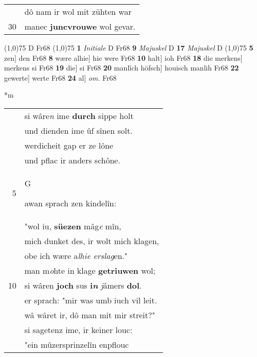\documentclass[8pt,a4paper,notitlepage]{article}
\begin{document}
\begin{table}[ht]
\begin{minipage}[t]{0.5\linewidth}
\begin{tabular}{rl}
 & dô nam ir wol mit zühten war\\ 
30 & manec \textbf{juncvrouwe} wol gevar.\\ 
\end{tabular}
\scriptsize
\line(1,0){75} \newline
D Fr68 \newline
\line(1,0){75} \newline
\textbf{1} \textit{Initiale} D Fr68  \textbf{9} \textit{Majuskel} D  \textbf{17} \textit{Majuskel} D  \newline
\line(1,0){75} \newline
\textbf{5} zen] den Fr68 \textbf{8} wære alhie] hie were Fr68 \textbf{10} halt] ioh Fr68 \textbf{18} die merkens] merkens si Fr68 \textbf{19} die] si Fr68 \textbf{20} manlîch höfsch] houisch manlih Fr68 \textbf{22} gewerte] werte Fr68 \textbf{24} al] \textit{om.} Fr68 \newline
\end{minipage}
\hspace{0.5cm}
\begin{minipage}[t]{0.5\linewidth}
\small
\begin{center}*m
\end{center}
\begin{tabular}{rl}
 & si wâre\textit{n} ime \textbf{durch} sippe holt\\ 
 & und dienden ime ûf sînen solt.\\ 
 & werdicheit gap er ze lône\\ 
 & und pflac ir anders schône.\\ 
5 & \begin{large}G\end{large}awan sprach zen kindelîn:\\ 
 & "wol iu, \textbf{süezen} mâg\textit{e} mîn,\\ 
 & mich dunket des, ir wolt mich klagen,\\ 
 & obe ich wære a\textit{lhie erslag}en."\\ 
 & man m\textit{o}hte in klage \textbf{getriuwen} wol;\\ 
10 & si wâren \textbf{joch} sus \textbf{i\textit{n}} \textit{j}âmers \textbf{dol}.\\ 
 & er sprach: "mir was umb iuch vil leit.\\ 
 & wâ wâret ir, dô man mit mir streit?"\\ 
 & si sagetenz ime, ir keiner louc:\\ 
 & "ein mûzersprinzelîn enpflouc\\ 

\end{tabular}
\end{minipage}
\end{table}
\end{document}
